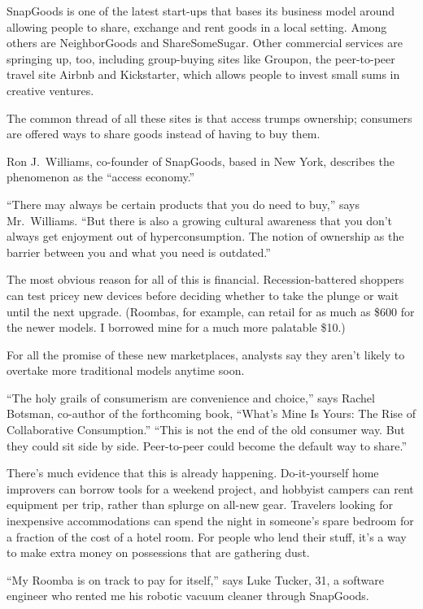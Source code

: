 ﻿\documentclass[12pt]{article}
\begin{document}
SnapGoods is one of the latest start-ups that bases its business model around allowing people to
share, exchange and rent goods in a local setting. Among others are NeighborGoods and
ShareSomeSugar. Other commercial services are springing up, too, including group-buying sites like
Groupon, the peer-to-peer travel site Airbnb and Kickstarter, which allows people to invest small
sums in creative ventures.

The common thread of all these sites is that access trumps ownership; consumers are offered ways to
share goods instead of having to buy them.

Ron J.~Williams, co-founder of SnapGoods, based in New York, describes the phenomenon as the
``access economy.''

``There may always be certain products that you do need to buy,'' says Mr.~Williams. ``But there is
also a growing cultural awareness that you don't always get enjoyment out of hyperconsumption. The
notion of ownership as the barrier between you and what you need is outdated.''

The most obvious reason for all of this is financial. Recession-battered shoppers can test pricey
new devices before deciding whether to take the plunge or wait until the next upgrade. (Roombas, for
example, can retail for as much as \$600 for the newer models. I borrowed mine for a much more
palatable \$10.)

For all the promise of these new marketplaces, analysts say they aren't likely to overtake more
traditional models anytime soon.

``The holy grails of consumerism are convenience and choice,'' says Rachel Botsman, co-author of the
forthcoming book, ``What's Mine Is Yours: The Rise of Collaborative Consumption.'' ``This is not the
end of the old consumer way. But they could sit side by side. Peer-to-peer could become the default
way to share.''

There's much evidence that this is already happening. Do-it-yourself home improvers can borrow tools
for a weekend project, and hobbyist campers can rent equipment per trip, rather than splurge on
all-new gear. Travelers looking for inexpensive accommodations can spend the night in someone's
spare bedroom for a fraction of the cost of a hotel room. For people who lend their stuff, it's a
way to make extra money on possessions that are gathering dust.

``My Roomba is on track to pay for itself,'' says Luke Tucker, 31, a software engineer who rented me
his robotic vacuum cleaner through SnapGoods.
\end{document}
